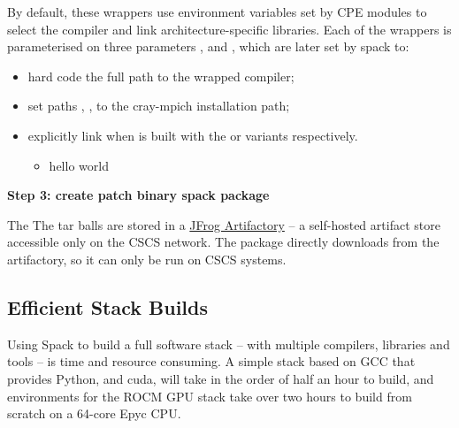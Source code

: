 By default, these wrappers use environment variables set by CPE modules to select the compiler and link architecture-specific libraries.
Each of the wrappers is parameterised on three parameters ,  and , which are later set by spack to:
\begin{itemize}
    \item hard code the full path to the wrapped compiler;
    \item set paths , , to the cray-mpich \spack installation path;
    \item explicitly link   when \craympich is built with the  or  variants respectively.
    \begin{itemize}
        \item hello world
    \end{itemize}
\end{itemize}


\noindent\textbf{Step 3: create patch binary spack package}

The 
The tar balls are stored in a \href{https://jfrog.com/artifactory/}{JFrog Artifactory} -- a self-hosted artifact store accessible only on the CSCS network.
The \spack package directly downloads from the artifactory, so it can only be run on CSCS systems.

\href{https://github.com/eth-cscs/stackinator/blob/master/stackinator/repo/packages/cray-mpich/package.py}{}

\subsection{Efficient Stack Builds}

Using Spack to build a full software stack -- with multiple compilers, libraries and tools -- is time and resource consuming.
A simple stack based on GCC that provides Python, \craympich and cuda, will take in the order of half an hour to build, and environments for the ROCM GPU stack take over two hours to build from scratch on a 64-core Epyc CPU.

